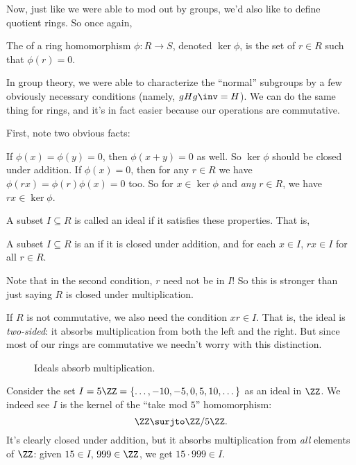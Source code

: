 Now, just like we were able to mod out by groups, we'd also like to define quotient rings.
So once again,
\begin{definition}
	The  of a ring homomorphism $\phi : R \to S$,
	denoted $\ker \phi$, is the set of $r \in R$ such that $\phi(r) = 0$.
\end{definition}

In group theory, we were able to characterize the ``normal'' subgroups by a few
obviously necessary conditions (namely, $gHg\inv = H$).
We can do the same thing for rings, and it's in fact easier because our operations are commutative.

First, note two obvious facts:
\begin{itemize}
	\ii If $\phi(x) = \phi(y) = 0$, then $\phi(x+y) = 0$ as well.
	So $\ker \phi$ should be closed under addition.
	\ii If $\phi(x) = 0$, then for any $r \in R$ we have
	$\phi(rx) = \phi(r)\phi(x) = 0$ too.
	So for $x \in \ker \phi$ and \emph{any} $r \in R$,
	we have $rx \in \ker\phi$.
\end{itemize}

A subset $I \subseteq R$ is called an ideal if it satisfies these properties.
That is,
\begin{definition}
	A subset $I \subseteq R$ is an 
	if it is closed under addition, and for each $x \in I$,
	$rx \in I$ for all $r \in R$.
\end{definition}
Note that in the second condition, $r$ need not be in $I$!
So this is stronger than just saying $R$ is closed under multiplication.
\begin{remark}
	If $R$ is not commutative, we also need the condition $xr \in I$.
	That is, the ideal is \emph{two-sided}: it absorbs multiplication
	from both the left and the right.
	But since most of our rings are commutative we needn't worry with this distinction.
\end{remark}

\begin{figure}[ht]
	\centering
	\caption{Ideals absorb multiplication.}
\end{figure}

\begin{example}
	Consider the set $I = 5\ZZ = \{\dots,-10,-5,0,5,10,\dots\}$ as an ideal in $\ZZ$.
	We indeed see $I$ is the kernel of the ``take mod $5$'' homomorphism:
	\[ \ZZ \surjto \ZZ/5\ZZ. \]
	It's clearly closed under addition,
	but it absorbs multiplication from \emph{all} elements of $\ZZ$:
	given $15 \in I$, $999 \in \ZZ$, we get $15 \cdot 999 \in I$.
\end{example}

